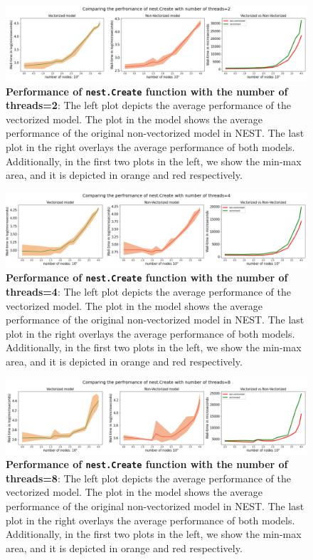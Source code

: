 \begin{figure}[ht!]
    \centering
    \includegraphics[width=\textwidth]{src/pic/thread_2.png}
    \caption{\textbf{Performance of \texttt{nest.Create} function with the number of threads=2}: The left plot depicts the average performance of the vectorized model. The plot in the model shows the average performance of the original non-vectorized model in NEST. The last plot in the right overlays the average performance of both models. Additionally, in the first two plots in the left, we show the min-max area, and it is depicted in orange and red respectively.}
    \label{fig:threads_2}
\end{figure}

\begin{figure}[ht!]
    \centering
    \includegraphics[width=\textwidth]{src/pic/thread_4.png}
    \caption{\textbf{Performance of \texttt{nest.Create} function with the number of threads=4}: The left plot depicts the average performance of the vectorized model. The plot in the model shows the average performance of the original non-vectorized model in NEST. The last plot in the right overlays the average performance of both models. Additionally, in the first two plots in the left, we show the min-max area, and it is depicted in orange and red respectively.}
    \label{fig:threads_4}
\end{figure}

\begin{figure}[ht!]
    \centering
    \includegraphics[width=\textwidth]{src/pic/thread_8.png}
    \caption{\textbf{Performance of \texttt{nest.Create} function with the number of threads=8}: The left plot depicts the average performance of the vectorized model. The plot in the model shows the average performance of the original non-vectorized model in NEST. The last plot in the right overlays the average performance of both models. Additionally, in the first two plots in the left, we show the min-max area, and it is depicted in orange and red respectively.}
    \label{fig:threads_8}
\end{figure}


